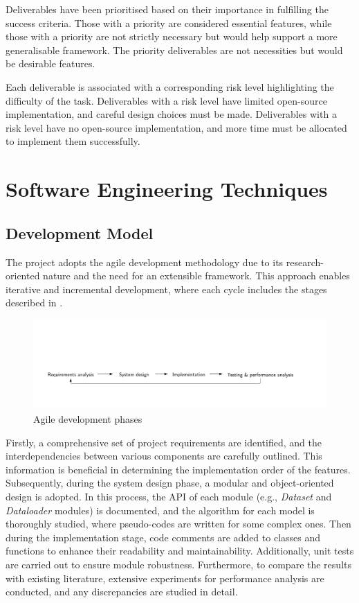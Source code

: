 Deliverables have been prioritised based on their importance in fulfilling the success criteria. Those with a {} priority are considered essential features, while those with a {} priority are not strictly necessary but would help support a more generalisable framework. The {} priority deliverables are not necessities but would be desirable features.

Each deliverable is associated with a corresponding risk level highlighting the difficulty of the task. Deliverables with a {} risk level have limited open-source implementation, and careful design choices must be made. Deliverables with a {} risk level have no open-source implementation, and more time must be allocated to implement them successfully.

\section{Software Engineering Techniques}
\subsection{Development Model}
The project adopts the agile development methodology due to its research-oriented nature and the need for an extensible framework. This approach enables iterative and incremental development, where each cycle includes the stages described in .
\begin{figure}[!ht]
    \centering
    \includegraphics[width=\hsize]{figures/preparation_media/agile.pdf}
    \caption{Agile development phases}
    \label{fig:agile}
\end{figure}
\vspace{-0.8em}

Firstly, a comprehensive set of project requirements are identified, and the interdependencies between various components are carefully outlined. This information is beneficial in determining the implementation order of the features. Subsequently, during the system design phase, a modular and object-oriented design is adopted. In this process, the API of each module (e.g., \textit{Dataset} and \textit{Dataloader} modules) is documented, and the algorithm for each model is thoroughly studied, where pseudo-codes are written for some complex ones. Then during the implementation stage, code comments are added to classes and functions to enhance their readability and maintainability. Additionally, unit tests are carried out to ensure module robustness. Furthermore, to compare the results with existing literature, extensive experiments for performance analysis are conducted, and any discrepancies are studied in detail.  


